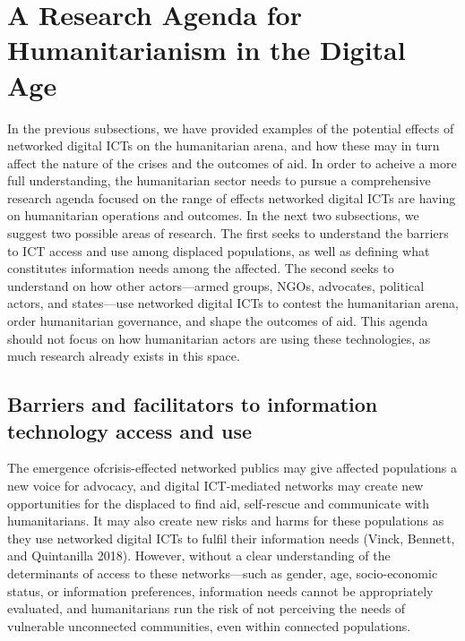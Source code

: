 \hypertarget{a-research-agenda-for-humanitarianism-in-the-digital-age}{%
\section{A Research Agenda for Humanitarianism in the Digital
Age}\label{a-research-agenda-for-humanitarianism-in-the-digital-age}}

In the previous subsections, we have provided examples of the potential
effects of networked digital ICTs on the humanitarian arena, and how
these may in turn affect the nature of the crises and the outcomes of
aid. In order to acheive a more full understanding, the humanitarian
sector needs to pursue a comprehensive research agenda focused on the
range of effects networked digital ICTs are having on humanitarian
operations and outcomes. In the next two subsections, we suggest two
possible areas of research. The first seeks to understand the barriers
to ICT access and use among displaced populations, as well as defining
what constitutes information needs among the affected. The second seeks
to understand on how other actors---armed groups, NGOs, advocates,
political actors, and states---use networked digital ICTs to contest the
humanitarian arena, order humanitarian governance, and shape the
outcomes of aid. This agenda should not focus on how humanitarian actors
are using these technologies, as much research already exists in this
space.

\hypertarget{barriers-and-facilitators-to-information-technology-access-and-use}{%
\subsection{Barriers and facilitators to information technology access
and
use}\label{barriers-and-facilitators-to-information-technology-access-and-use}}

The emergence ofcrisis-effected networked publics may give affected
populations a new voice for advocacy, and digital ICT-mediated networks
may create new opportunities for the displaced to find aid, self-rescue
and communicate with humanitarians. It may also create new risks and
harms for these populations as they use networked digital ICTs to fulfil
their information needs (Vinck, Bennett, and Quintanilla 2018). However,
without a clear understanding of the determinants of access to these
networks---such as gender, age, socio-economic status, or information
preferences, information needs cannot be appropriately evaluated, and
humanitarians run the risk of not perceiving the needs of vulnerable
unconnected communities, even within connected populations.

